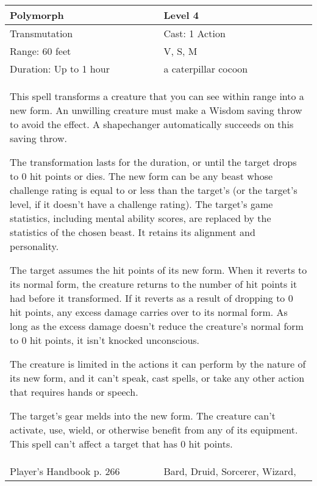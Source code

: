 \documentclass[11pt]{report}
\begin{document}
\begin{table}[H]
	\begin{tabular}{||p{6cm}|p{6cm}||}
		\hline\hline
		\bf{Polymorph} & Level 4\\ \hline
		Transmutation & Cast: 1 Action\\ \hline
		Range: 60 feet & V, S, M\\ \hline
		Duration: Up to 1 hour & a caterpillar cocoon\\ \hline
		\multicolumn{2}{||p{12cm}||}{This spell transforms a creature that you can see within range into a new form. An unwilling creature must make a Wisdom saving throw to avoid the effect. A shapechanger automatically succeeds on this saving throw.

The transformation lasts for the duration, or until the target drops to 0 hit points or dies. The new form can be any beast whose challenge rating is equal to or less than the target’s (or the target’s level, if it doesn’t have a challenge rating). The target’s game statistics, including mental ability scores, are replaced by the statistics of the chosen beast. It retains its alignment and personality.

The target assumes the hit points of its new form. When it reverts to its normal form, the creature returns to the number of hit points it had before it transformed. If it reverts as a result of dropping to 0 hit points, any excess damage carries over to its normal form. As long as the excess damage doesn’t reduce the creature’s normal form to 0 hit points, it isn’t knocked unconscious.

The creature is limited in the actions it can perform by the nature of its new form, and it can’t speak, cast spells, or take any other action that requires hands or speech.

The target’s gear melds into the new form. The creature can’t activate, use, wield, or otherwise benefit from any of its equipment. This spell can’t affect a target that has 0 hit points.}\\ \hline
Player's Handbook p. 266 & Bard, Druid, Sorcerer, Wizard, \\ \hline\hline
	\end{tabular}
\end{table}
\end{document}
